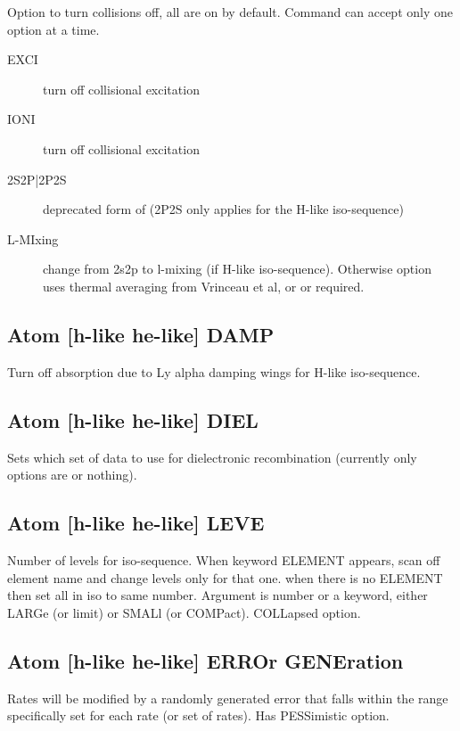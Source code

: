 Option to turn collisions off, all are on by default.  
Command can accept only one option at a time.
\begin{description}
\item[EXCI] turn off collisional excitation
\item[IONI] turn off collisional excitation
\item[2S2P|2P2S]  deprecated form of  (2P2S only applies for the H-like iso-sequence)
\item[L-MIxing] change from 2s2p to l-mixing (if H-like iso-sequence).
Otherwise  option uses thermal averaging from
Vrinceau et al, or  or  required.
\end{description}


\subsection{Atom [h-like \OR{} he-like] DAMP}

Turn off absorption due to Ly alpha damping wings for H-like
iso-sequence.

\subsection{Atom [h-like \OR{} he-like] DIEL}

Sets which set of data to use for dielectronic
recombination (currently only options are  or nothing).

\subsection{Atom [h-like \OR{} he-like] LEVE}

Number of levels for iso-sequence.  When keyword ELEMENT
appears, scan off element name and change levels only for that one.
when there is no ELEMENT then set all in iso to same number.  Argument
is number or a keyword, either LARGe (or limit) or SMALl (or COMPact).
COLLapsed option.

\subsection{Atom [h-like \OR{} he-like] ERROr GENEration}

Rates will be modified by a randomly generated
error that falls within the range specifically set for each rate (or
set of rates).  Has PESSimistic option.

